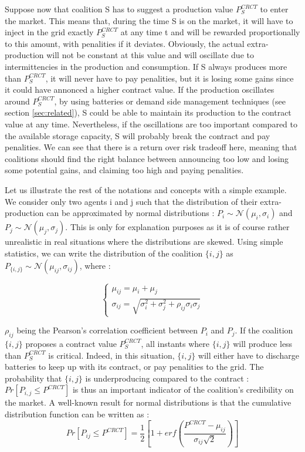 \documentclass[conference]{IEEEtran}
\begin{document}
Suppose now that coalition S has to suggest a production value $ P_{S}^{CRCT} $ to enter the market. This means that, during the time S is on the market, it will have to inject in the grid exactly $ P_{S}^{CRCT} $ at any time t and will be rewarded proportionally to this amount, with penalities if it deviates. Obviously, the actual extra-production will not be constant at this value and will oscillate due to intermittencies in the production and consumption. If S always produces more than $ P_{S}^{CRCT} $, it will never have to pay penalities, but it is losing some gains since it could have annonced a higher contract value. If the production oscillates around $ P_{S}^{CRCT} $, by using batteries or demand side management techniques (see section \ref{sec:related}), S could be able to maintain its production to the contract value at any time. Nevertheless, if the oscillations are too important compared to the available storage capacity, S will probably break the contract and pay penalities. We can see that there is a return over risk tradeoff here, meaning that coalitions should find the right balance between announcing too low and losing some potential gains, and claiming too high and paying penalities. 

Let us illustrate the rest of the notations and concepts with a simple example. We consider only two agents i and j such that the distribution of their extra-production can be approximated by normal distributions : $ P_{i} \sim \mathcal{N}(\mu_{i}, \sigma_{i} ) $ and $ P_{j} \sim \mathcal{N}(\mu_{j}, \sigma_{j} ) $. This is only for explanation purposes as it is of course rather unrealistic in real situations where the distributions are skewed. Using simple statistics, we can write the distribution of the coalition $ \{i,j\} $ as $ P_{\{i,j\}} \sim \mathcal{N}(\mu_{ij}, \sigma_{ij}) $, where :

\begin{equation}
\left\{ \begin{array}{lll}
		\mu_{ij} = \mu_{i} + \mu_{j} \\
		\sigma_{ij} = \sqrt{\sigma_{i}^{2} + \sigma_{j}^{2} + \rho_{ij} \sigma_{i} \sigma_{j} }
\end{array} \right.
\end{equation}

$ \rho_{ij} $ being the Pearson's correlation coefficient between $ P_{i} $ and $ P_{j} $. If the coalition $ \{i,j\}$ proposes a contract value $ P_{S}^{CRCT} $, all instants where $ \{i,j\}$ will produce less than $ P_{S}^{CRCT} $ is critical. Indeed, in this situation, $ \{i,j\}$ will either have to discharge batteries to keep up with its contract, or pay penalities to the grid. The probability that $ \{i,j\}$ is underproducing compared to the contract : $ Pr[P_{i,j} \leq P^{CRCT}] $ is thus an important indicator of the coalition's credibility on the market. A well-known result for normal distributions is that the cumulative distribution function can be written as :
\begin{equation}
Pr[P_{ij} \leq P^{CRCT}] = \dfrac{1}{2} \left[ 1+ erf \left( \dfrac{P^{CRCT} - \mu_{ij}}{\sigma_{ij}\sqrt{2}} \right) \right] 
\end{equation}
\end{document}
